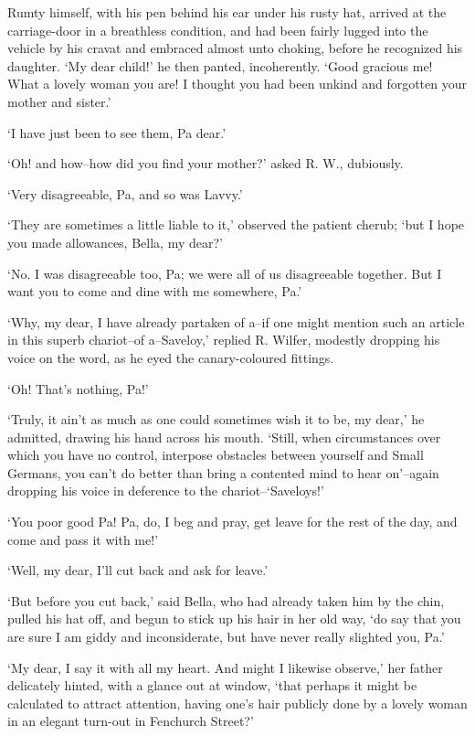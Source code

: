 Rumty himself, with his pen behind his ear under his rusty hat, arrived
at the carriage-door in a breathless condition, and had been fairly
lugged into the vehicle by his cravat and embraced almost unto choking,
before he recognized his daughter. ‘My dear child!’ he then panted,
incoherently. ‘Good gracious me! What a lovely woman you are! I thought
you had been unkind and forgotten your mother and sister.’

‘I have just been to see them, Pa dear.’

‘Oh! and how--how did you find your mother?’ asked R. W., dubiously.

‘Very disagreeable, Pa, and so was Lavvy.’

‘They are sometimes a little liable to it,’ observed the patient cherub;
‘but I hope you made allowances, Bella, my dear?’

‘No. I was disagreeable too, Pa; we were all of us disagreeable
together. But I want you to come and dine with me somewhere, Pa.’

‘Why, my dear, I have already partaken of a--if one might mention such
an article in this superb chariot--of a--Saveloy,’ replied R. Wilfer,
modestly dropping his voice on the word, as he eyed the canary-coloured
fittings.

‘Oh! That’s nothing, Pa!’

‘Truly, it ain’t as much as one could sometimes wish it to be, my
dear,’ he admitted, drawing his hand across his mouth. ‘Still, when
circumstances over which you have no control, interpose obstacles
between yourself and Small Germans, you can’t do better than bring a
contented mind to hear on’--again dropping his voice in deference to the
chariot--‘Saveloys!’

‘You poor good Pa! Pa, do, I beg and pray, get leave for the rest of the
day, and come and pass it with me!’

‘Well, my dear, I’ll cut back and ask for leave.’

‘But before you cut back,’ said Bella, who had already taken him by the
chin, pulled his hat off, and begun to stick up his hair in her old way,
‘do say that you are sure I am giddy and inconsiderate, but have never
really slighted you, Pa.’

‘My dear, I say it with all my heart. And might I likewise observe,’ her
father delicately hinted, with a glance out at window, ‘that perhaps
it might be calculated to attract attention, having one’s hair publicly
done by a lovely woman in an elegant turn-out in Fenchurch Street?’

